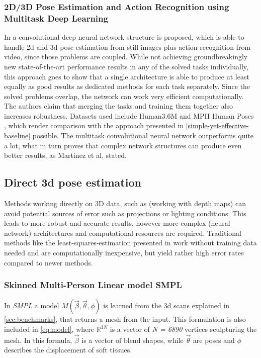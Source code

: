 \subsubsection{2D/3D Pose Estimation and Action Recognition using Multitask Deep Learning}
In \cite{Luvizon2018} a convolutional deep neural network structure is proposed, which is able to handle 2d and 3d pose estimation from still images plus action recognition from video, since those problems are coupled. While not achieving groundbreakingly new state-of-the-art performance results in any of the solved tasks individually, this approach goes to show that a single architecture is able to produce at least equally as good results as dedicated methods for each task separately. Since the solved problems overlap, the network can work very efficient computationally. The authors claim that merging the tasks and training them together also increases robustness. Datasets used include Human3.6M \cite{H3.6M} and MPII Human Poses \cite{andriluka14cvpr}, which render comparison with the approach presented in \autoref{simple-yet-effective-baseline} possible. The multitask convolutional neural network outperforms \cite{Martinez_2017_ICCV} quite a lot, what in turn proves that complex network structures can produce even better results, as Martinez et al. stated.


\subsection{Direct 3d pose estimation}
Methods working directly on 3D data, such as \cite{Ye2011} (working with depth maps) can avoid potential sources of error such as projections or lighting conditions. This leads to more robust and accurate results, however more complex (neural network) architectures and computational resources are required. Traditional methods like the least-squares-estimation presented in \cite{Haralick98} work without training data needed and are computationally inexpensive, but yield rather high error rates compared to newer methods.

\subsubsection{Skinned Multi-Person Linear model SMPL}
In \emph{SMPL} a model $M(\vec{\beta},\vec{\theta},\phi)$ is learned from the 3d scans explained in \autoref{sec:benchmarks}, that returns a mesh from the input. This formulation is also included in \autoref{eq:model}, where $\mathbb{R}^{3N}$ is a vector of \emph{N = 6890} vertices sculpturing the mesh. In this formula, $\vec{\beta}$ is a vector of blend shapes, while $\vec{\theta}$ are poses and $\phi$ describes the displacement of soft tissues.

